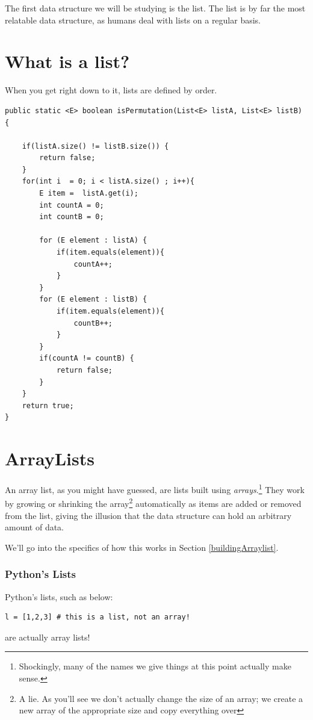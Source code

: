 \documentclass[10pt,a4paper]{book}
\begin{document}
\label{arraylist}
The first data structure we will be studying is the list.
The list is by far the most relatable data structure, as humans deal with lists on a regular basis.

\section{What is a list?}
When you get right down to it, lists are defined by order.


\begin{verbatim}
public static <E> boolean isPermutation(List<E> listA, List<E> listB) {
	
	if(listA.size() != listB.size()) {
		return false;
	}
	for(int i  = 0; i < listA.size() ; i++){
		E item =  listA.get(i);
		int countA = 0;
		int countB = 0;
		
		for (E element : listA) {
			if(item.equals(element)){
				countA++;
			}
		}
		for (E element : listB) {
			if(item.equals(element)){
				countB++;
			}
		}
		if(countA != countB) {
			return false;
		}
	}
	return true;
}
\end{verbatim}



\section{ArrayLists}
An array list, as you might have guessed, are lists built using \textit{arrays}.\footnote{Shockingly, many of the names we give things at this point actually make sense.}
They work by growing or shrinking the array\footnote{A lie.  As you'll see we don't actually change the size of an array;  we create a new array of the appropriate size and copy everything over} automatically as items are added or removed from the list, giving the illusion that the data structure can hold an arbitrary amount of data.

We'll go into the specifics of how this works in Section \ref{buildingArraylist}.


\subsubsection{Python's Lists}
Python's lists, such as below:
\begin{verbatim}
l = [1,2,3] # this is a list, not an array!	
\end{verbatim}
are actually array lists! %
\end{document}
